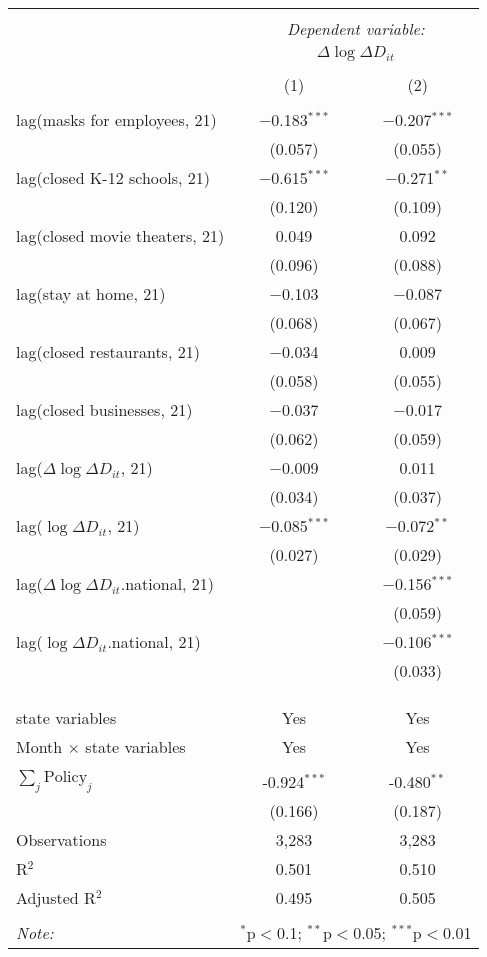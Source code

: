 \begin{tabular}{@{\extracolsep{1pt}}lcc} 
\\[-1.8ex]\hline 
\hline \\[-1.8ex] 
 & \multicolumn{2}{c}{\textit{Dependent variable:}} \\ 
\cline{2-3} 
 & \multicolumn{2}{c}{$\Delta \log \Delta D_{it}$} \\ 
\\[-1.8ex] & (1) & (2)\\ 
\hline \\[-1.8ex] 
 lag(masks for employees, 21) & $-$0.183$^{***}$ & $-$0.207$^{***}$ \\ 
  & (0.057) & (0.055) \\ 
  lag(closed K-12 schools, 21) & $-$0.615$^{***}$ & $-$0.271$^{**}$ \\ 
  & (0.120) & (0.109) \\ 
  lag(closed movie theaters, 21) & 0.049 & 0.092 \\ 
  & (0.096) & (0.088) \\ 
  lag(stay at home, 21) & $-$0.103 & $-$0.087 \\ 
  & (0.068) & (0.067) \\ 
  lag(closed restaurants, 21) & $-$0.034 & 0.009 \\ 
  & (0.058) & (0.055) \\ 
  lag(closed businesses, 21) & $-$0.037 & $-$0.017 \\ 
  & (0.062) & (0.059) \\ 
  lag($\Delta \log \Delta D_{it}$, 21) & $-$0.009 & 0.011 \\ 
  & (0.034) & (0.037) \\ 
  lag($\log \Delta D_{it}$, 21) & $-$0.085$^{***}$ & $-$0.072$^{**}$ \\ 
  & (0.027) & (0.029) \\ 
  lag($\Delta \log \Delta D_{it}$.national, 21) &  & $-$0.156$^{***}$ \\ 
  &  & (0.059) \\ 
  lag($\log \Delta D_{it}$.national, 21) &  & $-$0.106$^{***}$ \\ 
  &  & (0.033) \\ 
   &  &  \\ 
  &  &  \\ 
 \hline \\[-1.8ex] 
state variables & Yes & Yes \\ 
Month $\times$ state variables & Yes & Yes \\ 
\hline \\[-1.8ex] 
$\sum_j \mathrm{Policy}_j$ & -0.924$^{***}$ & -0.480$^{**}$ \\ 
 & (0.166) & (0.187) \\ 
Observations & 3,283 & 3,283 \\ 
R$^{2}$ & 0.501 & 0.510 \\ 
Adjusted R$^{2}$ & 0.495 & 0.505 \\ 
\hline 
\hline \\[-1.8ex] 
\textit{Note:}  & \multicolumn{2}{r}{$^{*}$p$<$0.1; $^{**}$p$<$0.05; $^{***}$p$<$0.01} \\ 
\end{tabular} 